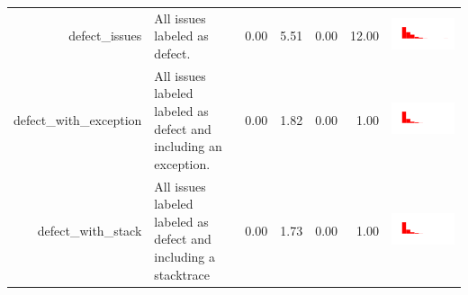 \begin{table}[ht]
\begin{tabular}{rp{27em}rrrrc}
  defect\_issues & All issues labeled as defect. & 0.00 & 5.51 & 0.00 & 12.00 & \includegraphics[scale = 0.08, clip = true, trim= 50px 70px 50px 60px]{hist-5d0ab95cd3e300c21b0a40d6bec58e4c.pdf} \\ 
  defect\_with\_exception & All issues labeled labeled as defect and including an exception. & 0.00 & 1.82 & 0.00 & 1.00 & \includegraphics[scale = 0.08, clip = true, trim= 50px 70px 50px 60px]{hist-502028d1a7e2e77414e2f9f63e0bcd50.pdf} \\ 
  defect\_with\_stack & All issues labeled labeled as defect and including a stacktrace & 0.00 & 1.73 & 0.00 & 1.00 & \includegraphics[scale = 0.08, clip = true, trim= 50px 70px 50px 60px]{hist-dab0764147debd99066c84814d46d50e.pdf} \\ 

\end{tabular}
\end{table}
